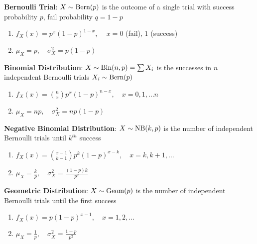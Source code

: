\documentclass[12pt, a4paper]{article}
\begin{document}
\begin{multicols*}{3}
\textbf{Bernoulli Trial}: $X \sim \text{Bern}(p)$ is the outcome of a single trial with success probability $p$, fail probability $q=1-p$
\begin{enumerate}[\roman*.]
  \item $f_X(x) = p^x(1-p)^{1-x}$, $\quad x=0$ (fail), $1$ (success)
  \item $\mu_X = p,\quad \sigma^2_X = p(1-p)$
\end{enumerate}

\textbf{Binomial Distribution}: $X \sim \text{Bin}(n, p) = \sum X_i$ is the successes in $n$ independent Bernoulli trials $X_i \sim \text{Bern}(p)$
\begin{enumerate}[\roman*.]
  \item $f_X(x) = \binom nx p^x(1-p)^{n-x},\quad x=0,1,\dots n$
  \item $\mu_X = np,\quad \sigma^2_X = np(1-p)$
\end{enumerate}

\textbf{Negative Binomial Distribution}: $X \sim \text{NB}(k, p)$ is the number of independent Bernoulli trials until $k^{th}$ success
\begin{enumerate}[\roman*.]
  \item $f_X(x) = \binom {x-1}{k-1} p^k(1-p)^{x-k},\quad x=k, k+1,\dots$
  \item $\mu_X = \frac{k}{p},\quad\sigma^2_X = \frac{(1-p)k}{p^2}$
\end{enumerate}

\textbf{Geometric Distribution}: $X \sim \text{Geom}(p)$ is the number of independent Bernoulli trials until the first success
\begin{enumerate}[\roman*.]
  \item $f_X(x) = p(1 - p)^{x - 1}, \quad x = 1, 2, \dots$
  \item $\mu_X = \frac{1}{p},\quad\sigma^2_X = \frac{1 - p}{p^2}$
\end{enumerate}


\end{multicols*}
\end{document}
